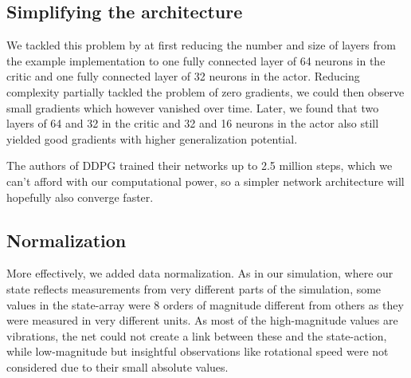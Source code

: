 \documentclass[hyperref,beleg]{cgvpub}
\begin{document}
\subsection{Simplifying the architecture}

We tackled this problem by at first reducing the number and size of layers from the example implementation to one fully connected layer of 64 neurons in the critic and one fully connected layer of 32 neurons in the actor. Reducing complexity partially tackled the problem of zero gradients, we could then observe small gradients which however vanished over time. Later, we found that two layers of 64 and 32 in the critic and 32 and 16 neurons in the actor also still yielded good gradients with higher generalization potential.

The authors of \ac{DDPG} trained their networks up to 2.5 million steps, which we can't afford with our computational power, so a simpler network architecture will hopefully also converge faster.

\subsection{Normalization}

More effectively, we added data normalization. As in our simulation, where our state reflects measurements from very different parts of the simulation, some values in the state-array were 8 orders of magnitude different from others as they were measured in very different units. As most of the high-magnitude values are vibrations, the net could not create a link between these and the state-action, while low-magnitude but insightful observations like rotational speed were not considered due to their small absolute values. 
\end{document}
